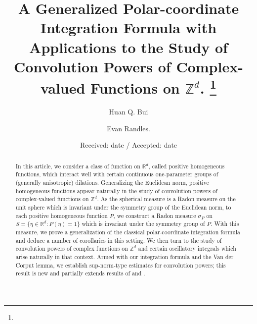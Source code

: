 \documentclass[smallextended]{svjour3}
\theoremstyle{remark}
\begin{document}
\title{A Generalized Polar-coordinate Integration Formula with Applications to the Study of Convolution Powers of Complex-valued Functions on $\mathbb{Z}^d$. 
\thanks{}
}

\author{Huan Q. Bui        \and
        Evan Randles.
}



\date{Received: date / Accepted: date}



\maketitle

\begin{abstract}
In this article, we consider a class of function on $\mathbb{R}^d$, called positive homogeneous functions, which interact well with certain continuous one-parameter groups of (generally anisotropic) dilations. Generalizing the Euclidean norm, positive homogeneous functions appear naturally in the study of convolution powers of complex-valued functions on $\mathbb{Z}^d$. As the spherical measure is a Radon measure on the unit sphere which is invariant under the symmetry group of the Euclidean norm, to each positive homogeneous function $P$, we construct a Radon measure $\sigma_P$ on $S=\{\eta \in \mathbb{R}^d:P(\eta)=1\}$ which is invariant under the symmetry group of $P$. With this measure, we prove a generalization of the classical polar-coordinate integration formula and deduce a number of corollaries in this setting. We then turn to the study of convolution powers of complex functions on $\mathbb{Z}^d$ and certain oscillatory integrals which arise naturally in that context. Armed with our integration formula and the Van der Corput lemma, we establish sup-norm-type estimates for convolution powers; this result is new and partially extends results of \cite{randles_convolution_2015} and \cite{randles_convolution_2017}.


\noindent 
{}
\end{abstract}
\end{document}
